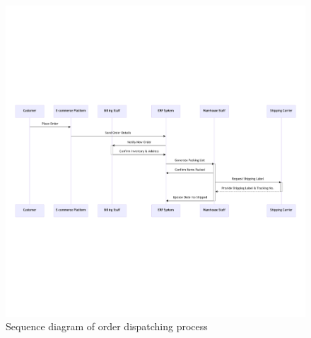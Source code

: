 \begin{figure}[H]\centering
\includegraphics[width=140mm]{img/chap02/fig_proces_sequence_diagram.png}
\caption{Sequence diagram of order dispatching process}
\label{img02:order-dispatch-process}
\end{figure}

